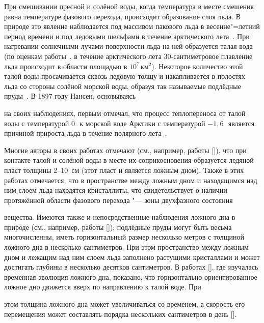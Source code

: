 


 При смешивании пресной и солёной воды, когда температура в месте смешения равна температуре фазового перехода, происходит образование слоя льда. В природе это явление наблюдается под массивом пакового льда в весенне"=летний период времени и под ледовыми шельфами в течение арктического лета~\cite{niz:bib:1}. При нагревании солнечными лучами поверхности льда на ней образуется талая вода (по оценкам работы~\cite{niz:bib:2}, в течение арктического лета 30-сантиметровое плавление льда происходит в области площадью в $10^7\,\text{км}^2$). Некоторое количество этой талой воды просачивается сквозь ледовую толщу и накапливается в полостях льда со стороны солёной морской воды, образуя так называемые подлёдные пруды~\cite{niz:bib:3}. В 1897 году Нансен, основываясь 

на своих наблюдениях, первым отмечал, что процесс теплопереноса от талой воды с температурой $0$\,\textcelsius\ к морской воде Арктики с температурой $-1{,}6$\,\textcelsius\ является причиной прироста льда в течение полярного лета~\cite{niz:bib:4}.



Многие авторы в своих работах отмечают (см., например, работы []), что при контакте талой и солёной воды в месте их соприкосновения образуется ледяной пласт толщины 2--10~см (этот пласт и является ложным дном). Также в этих работах отмечается, что в пространстве между ложным дном и находящимся над ним слоем льда находятся кристаллиты, что свидетельствует о наличии протяжённой области фазового перехода "--- зоны двухфазного состояния 

вещества. Имеются также и непосредственные наблюдения ложного дна в природе (см., например, работы []); подлёдные пруды могут быть весьма многочисленны, иметь горизонтальный размер несколько метров с толщиной ложного дна в несколько сантиметров. При этом пространство между ложным дном и лежащим над ним слоем льда заполнено растущими кристаллами и может достигать глубины в несколько десятков сантиметров. В работах [], где изучалась временная эволюция ложного дна, показано, что горизонтально ориентированное ложное дно движется вверх по направлению к талой воде. При 

этом толщина ложного дна может увеличиваться со временем, а скорость его перемещения может составлять порядка нескольких сантиметров в день [].



